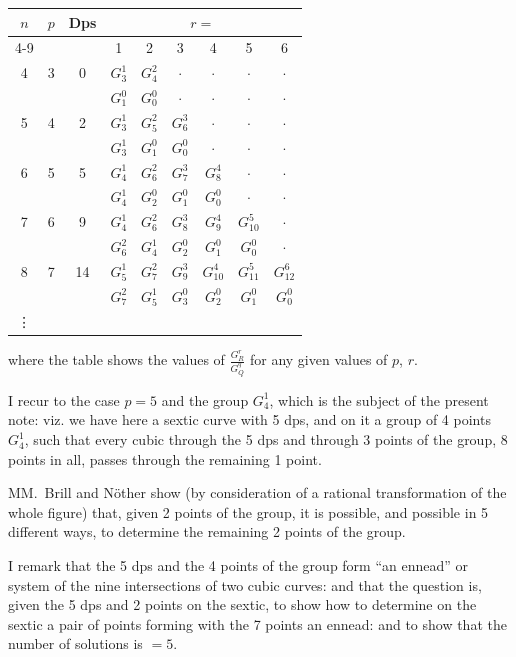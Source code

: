 \documentclass[11pt,a4paper]{article}
\theoremstyle{plain}
\theoremstyle{definition}
\theoremstyle{remark}
\begin{document}
\begin{center}
\begin{tabular}{|c|c|c|cccccc|}
\hline
$n$ & $p$ & Dps & \multicolumn{6}{c|}{$r = $}\\
\cline{4-9}
& & & 1 & 2 & 3 & 4 & 5 & 6\\
\hline
4 & 3 & 0 & $G_3^1$ & $G_4^2$ & $\cdot$ & $\cdot$ & $\cdot$ & $\cdot$\\
& & & $G_1^0$ & $G_0^0$ & $\cdot$ & $\cdot$ & $\cdot$ & $\cdot$\\
\hline
5 & 4 & 2 & $G_3^1$ & $G_5^2$ & $G_6^3$ & $\cdot$ & $\cdot$ & $\cdot$\\
& & & $G_3^1$ & $G_1^0$ & $G_0^0$ & $\cdot$ & $\cdot$ & $\cdot$\\
\hline
6 & 5 & 5 & $G_4^1$ & $G_6^2$ & $G_7^3$ & $G_8^4$ & $\cdot$ & $\cdot$\\
& & & $G_4^1$ & $G_2^0$ & $G_1^0$ & $G_0^0$ & $\cdot$ & $\cdot$\\
\hline
7 & 6 & 9 & $G_4^1$ & $G_6^2$ & $G_8^3$ & $G_9^4$ & $G_{10}^5$ & $\cdot$\\
& & & $G_6^2$ & $G_4^1$ & $G_2^0$ & $G_1^0$ & $G_0^0$ & $\cdot$\\
\hline
8 & 7 & 14 & $G_5^1$ & $G_7^2$ & $G_9^3$ & $G_{10}^4$ & $G_{11}^5$ & $G_{12}^6$\\
& & & $G_7^2$ & $G_5^1$ & $G_3^0$ & $G_2^0$ & $G_1^0$ & $G_0^0$\\
\hline
\vdots & & & & & & & &\\
\hline
\end{tabular}
\end{center}

where the table shows the values of $\displaystyle\frac{G_R^r}{G_Q^q}$ for any given values of $p$, $r$.

I recur to the case $p = 5$ and the group $G_4^1$, which is the subject of the present note: viz. we have here a sextic curve with 5 dps, and on it a group of 4 points $G_4^1$, such that every cubic through the 5 dps and through 3 points of the group, 8 points in all, passes through the remaining 1 point.

MM.~Brill and N\"{o}ther show (by consideration of a rational transformation of the whole figure) that, given 2 points of the group, it is possible, and possible in 5 different ways, to determine the remaining 2 points of the group.

I remark that the 5 dps and the 4 points of the group form ``an ennead'' or system of the nine intersections of two cubic curves: and that the question is, given the 5 dps and 2 points on the sextic, to show how to determine on the sextic a pair of points forming with the 7 points an ennead: and to show that the number of solutions is $= 5$.
\end{document}
